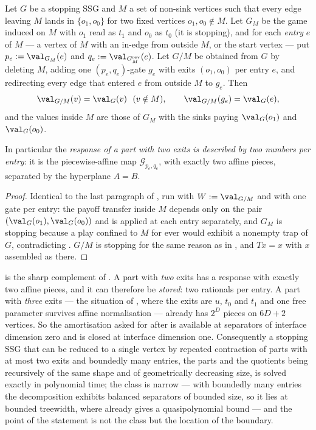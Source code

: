 \begin{theorem}\label{thm:fs16-contract}
Let $G$ be a stopping SSG and $M$ a set of non-sink vertices such that every
edge leaving $M$ lands in $\{o_1,o_0\}$ for two fixed vertices
$o_1,o_0\notin M$. Let $G_M$ be the game induced on $M$ with $o_1$ read as
$t_1$ and $o_0$ as $t_0$ (it is stopping), and for each \emph{entry}
$e$ of $M$ --- a vertex of $M$ with an in-edge from outside $M$, or the start
vertex --- put $p_e:=\val_{G_M}(e)$ and $q_e:=\val_{G_M^{\mathrm{rev}}}(e)$.
Let $G/M$ be obtained from $G$ by deleting $M$, adding one $(p_e,q_e)$-gate
$g_e$ with exits $(o_1,o_0)$ per entry $e$, and redirecting every edge that
entered $e$ from outside $M$ to $g_e$. Then
\[
  \val_{G/M}(v)=\val_G(v)\ \ (v\notin M),\qquad \val_{G/M}(g_e)=\val_G(e),
\]
and the values inside $M$ are those of $G_M$ with the sinks paying
$\val_G(o_1)$ and $\val_G(o_0)$.

In particular the \emph{response of a part with two exits is described by two
numbers per entry}: it is the piecewise-affine map $\mathcal{G}_{p_e,q_e}$,
with exactly two affine pieces, separated by the hyperplane $A=B$.
\end{theorem}

\begin{proof}
Identical to the last paragraph of , run with $W:=\val_{G/M}$
and with one gate per entry: the payoff transfer inside $M$ depends only on the
pair $(\val_G(o_1),\val_G(o_0))$ and is applied at each entry separately, and
$G_M$ is stopping because a play confined to $M$ for ever would exhibit a
nonempty trap of $G$, contradicting . $G/M$ is stopping for
the same reason as in , and $Tx=x$ with $x$ assembled as
there.
\end{proof}

\begin{remark}\label{rem:fs16-two}
 is the sharp complement of . A
part with \emph{two} exits has a response with exactly two affine pieces, and
it can therefore be \emph{stored}: two rationals per entry. A part with
\emph{three} exits --- the situation of , where the exits are
$u$, $t_0$ and $t_1$ and one free parameter survives affine normalisation ---
already has $2^{D}$ pieces on $6D+2$ vertices. So the amortisation asked for
after  is available at separators of interface
dimension zero and is closed at interface dimension one. Consequently a
stopping SSG that can be reduced to a single vertex by repeated contraction of
parts with at most two exits and boundedly many entries, the parts and the
quotients being recursively of the same shape and of geometrically decreasing
size, is solved exactly in polynomial time; the class is narrow --- with
boundedly many entries the decomposition exhibits balanced separators of
bounded size, so it lies at bounded treewidth, where  already
gives a quasipolynomial bound --- and the point of the statement is not the
class but the location of the boundary.
\end{remark}


